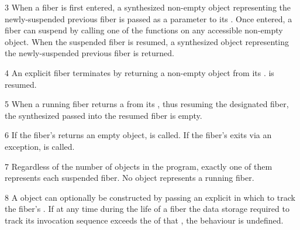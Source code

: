 3 When a fiber is first entered, a synthesized non-empty \fiber object
representing the newly-suspended previous fiber is passed as a parameter to
its \entryfn. Once entered, a fiber can suspend by calling one of the \anyresume
functions on any accessible non-empty \fiber object. When the
suspended fiber is resumed, a synthesized \fiber object
representing the newly-suspended previous fiber is returned.

4 An explicit fiber terminates by returning a non-empty \fiber object from
its \entryfn.  is resumed.



5 When a running fiber returns a \fiber from its \entryfn, thus resuming the
designated fiber, the synthesized \fiber passed into the resumed fiber is
empty.

6 If the fiber's \entryfn returns an empty \fiber object,  is called.
If the fiber's \entryfn exits via an exception,  is called.

7 Regardless of the number of \fiber objects in the program, exactly one of them
represents each suspended fiber. No \fiber object represents a running fiber.

8 A \fiber object can optionally be constructed by passing an explicit
 in which to track the fiber's
. If at any time during the
life of a fiber the data storage required to track its invocation sequence
exceeds the  of that , the behaviour is undefined.


